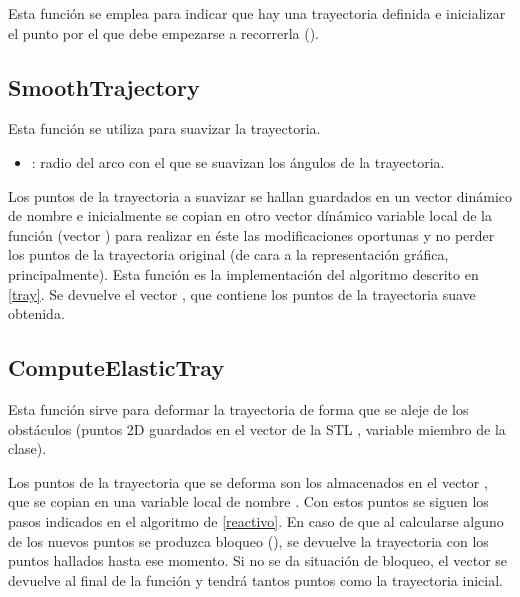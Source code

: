 \noindent
Esta función se emplea para indicar que hay una trayectoria definida e inicializar el punto por el que debe empezarse a recorrerla ().

\subsection{SmoothTrajectory}

\noindent
{}

\noindent
Esta función se utiliza para suavizar la trayectoria.
\begin{itemize}
  \item {}: radio del arco con el que se suavizan los ángulos de la trayectoria.
\end{itemize}

\noindent
Los puntos de la trayectoria a suavizar se hallan guardados en un vector dinámico de nombre  e inicialmente se copian en otro vector dínámico variable local de la función (vector ) para realizar en éste las modificaciones oportunas y no perder los puntos de la trayectoria original (de cara a la representación gráfica, principalmente).
Esta función es la implementación del algoritmo descrito en \ref{tray}. Se devuelve el vector , que contiene los puntos de la trayectoria suave obtenida.

\subsection{ComputeElasticTray}

\noindent
{}

\noindent
Esta función sirve para deformar la trayectoria de forma que se aleje de los obstáculos (puntos 2D guardados en el vector de la STL , variable miembro de la clase).

\noindent
Los puntos de la trayectoria que se deforma son los almacenados en el vector , que se copian en una variable local de nombre . Con estos puntos se siguen los pasos indicados en el algoritmo de \ref{reactivo}. En caso de que al calcularse alguno de los nuevos puntos se produzca bloqueo (), se devuelve la trayectoria  con los puntos hallados hasta ese momento. Si no se da situación de bloqueo, el vector  se devuelve al final de la función y tendrá tantos puntos como la trayectoria inicial.

